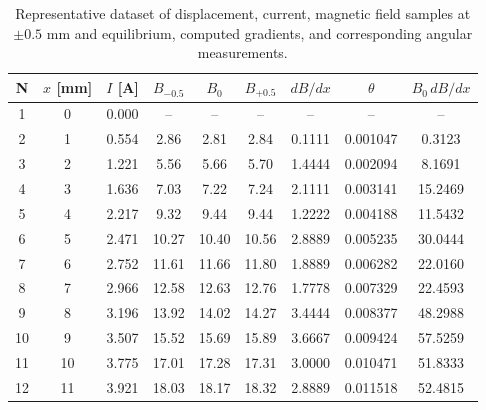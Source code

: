 \begin{table}[h!]
	\centering
	\begin{tabular}{|c |c |c |c |c |c |c |c |c|}
		\hline
		N & $x$ [mm] & $I$ [A] & $B_{-0.5}$ & $B_0$ & $B_{+0.5}$ & $dB/dx$ & $\theta$ & $B_0\,dB/dx$  \\
		\hline
		1  & 0  & 0.000 & --    & --    & --    & --          & --            & -- \\
		2  & 1  & 0.554 & 2.86  & 2.81  & 2.84  & 0.1111      & 0.001047      & 0.3123 \\
		3  & 2  & 1.221 & 5.56  & 5.66  & 5.70  & 1.4444      & 0.002094      & 8.1691 \\
		4  & 3  & 1.636 & 7.03  & 7.22  & 7.24  & 2.1111      & 0.003141      & 15.2469 \\
		5  & 4  & 2.217 & 9.32  & 9.44  & 9.44  & 1.2222      & 0.004188      & 11.5432 \\
		6  & 5  & 2.471 & 10.27 & 10.40 & 10.56 & 2.8889      & 0.005235      & 30.0444 \\
		7  & 6  & 2.752 & 11.61 & 11.66 & 11.80 & 1.8889      & 0.006282      & 22.0160 \\
		8  & 7  & 2.966 & 12.58 & 12.63 & 12.76 & 1.7778      & 0.007329      & 22.4593 \\
		9  & 8  & 3.196 & 13.92 & 14.02 & 14.27 & 3.4444      & 0.008377      & 48.2988 \\
		10 & 9  & 3.507 & 15.52 & 15.69 & 15.89 & 3.6667      & 0.009424      & 57.5259 \\
		11 & 10 & 3.775 & 17.01 & 17.28 & 17.31 & 3.0000      & 0.010471      & 51.8333 \\
		12 & 11 & 3.921 & 18.03 & 18.17 & 18.32 & 2.8889      & 0.011518      & 52.4815 \\
		\hline
	\end{tabular}
	\caption[Sample measurements of displacement]{Representative dataset of displacement, current, magnetic field samples at $\pm0.5$ mm and equilibrium, computed gradients, and corresponding angular measurements.}
	\label{tab:sampleData}
\end{table}

